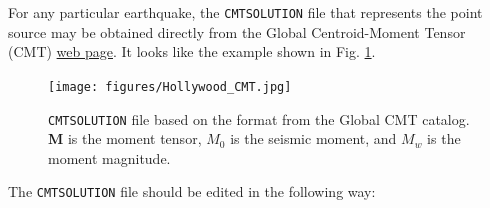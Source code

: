 For any particular earthquake, the \texttt{CMTSOLUTION} file that
represents the point source may be obtained directly from the Global
Centroid-Moment Tensor (CMT) \href{www.globalcmt.org}{web page}.
It looks like the example shown in Fig. \ref{fig:CMTSOLUTION-file}.
\begin{figure}[htp]
\begin{centering}
\texttt{[image: figures/Hollywood\_CMT.jpg]}
\par
\end{centering}
\caption{\texttt{CMTSOLUTION} file based on the
format from the Global CMT catalog. \textbf{M} is the moment tensor,
$M_{0}${\small {} }is the seismic moment, and $M_{w}$ is the moment
magnitude.}
\label{fig:CMTSOLUTION-file}
\end{figure}
%
The \texttt{CMTSOLUTION} file should be edited in the following way:
